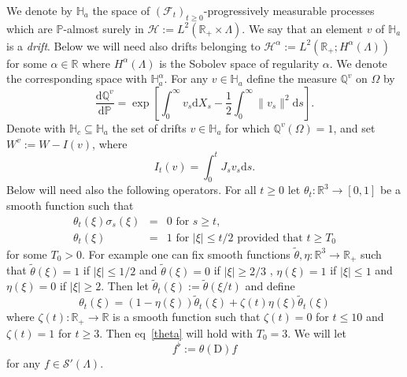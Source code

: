 \documentclass[11pt]{article}
\newcommand{\assign}{:=}
\newcommand{\mathD}{\mathrm{D}}
\newcommand{\mathd}{\mathrm{d}}
\newcommand{\tmtextit}[1]{{\itshape{#1}}}
\newcommand{\CF}{\mathscr{F}}
\newcommand{\CS}{\mathscr{S}}
\begin{document}
We denote by $\mathbb{H}_a$ the space of $\left( \CF_t \right)_{t \geqslant
0}$-progressively measurable processes which are $\mathbb{P}$-almost surely in
$\mathcal{H} \assign L^2 (\mathbb{R}_+ \times \Lambda)$. We say that an
element $v$ of $\mathbb{H}_a$ is a \tmtextit{drift}. Below we will need also
drifts belonging to $\mathcal{H}^{\alpha} \assign L^2 (\mathbb{R}_+ ;
H^{\alpha} (\Lambda))$ for some $\alpha \in \mathbb{R}$ where $H^{\alpha}
(\Lambda)$ is the Sobolev space of regularity $\alpha$. We denote the
corresponding space with $\mathbb{H}_a^{\alpha}$. For any $v \in \mathbb{H}_a$
define the measure $\mathbb{Q}^v$ on $\Omega$ by
\[ \frac{\mathd \mathbb{Q}^v}{\mathd \mathbb{P}} = \exp \left[ \int_0^{\infty}
   v_s \mathd X_s - \frac{1}{2} \int_0^{\infty} \| v_s \|^2 \mathd s \right] .
\]
Denote with $\mathbb{H}_c \subseteq \mathbb{H}_a$ the set of drifts $v \in
\mathbb{H}_a$ for which $\mathbb{Q}^v (\Omega) = 1$, and set $W^v \assign W -
I (v)$, where
\[ I_t (v) = \int^t_0 J_s v_s \mathd s. \]
Below will need also the following operators. For all $t \geqslant 0$ let
$\theta_t : \mathbb{R}^3 \rightarrow [0, 1]$ be a smooth function such that
\begin{equation}
  \begin{array}{lll}
    \theta_t (\xi) \sigma_s (\xi) & = & \text{$0$ for $s \geqslant t$,}\\
    \theta_t (\xi) & = & \text{$1$ for $| \xi | \leqslant t / 2$ \ provided
    that $t \geqslant T_0$}
  \end{array} \label{theta}
\end{equation}
for some $T_0 > 0$. For example one can fix smooth functions $\tilde{\theta},
\eta : \mathbb{R}^3 \rightarrow \mathbb{R}_+$ such that $\tilde{\theta} (\xi)
= 1$ if $| \xi | \leqslant 1 / 2$ and $\tilde{\theta} (\xi) = 0$ if $| \xi |
\geqslant 2 / 3$ , $\eta (\xi) = 1$ if $| \xi | \leqslant 1$ and $\eta (\xi) =
0$ if $| \xi | \geqslant 2$. Then let $\tilde{\theta}_t (\xi) \assign
\tilde{\theta} (\xi / t)$ and define
\[ \theta_t (\xi) = (1 - \eta (\xi)) \tilde{\theta}_t (\xi) + \zeta (t) \eta
   (\xi) \tilde{\theta}_t (\xi) \]
where $\zeta (t) : \mathbb{R}_+ \rightarrow \mathbb{R}$ is a smooth function
such that $\zeta (t) = 0$ for $t \leqslant 10$ and $\zeta (t) = 1$ for $t
\geqslant 3$. Then eq~{\eqref{theta}} will hold with $T_0 = 3$. We will let
\begin{equation}
  f^{\flat} \assign \theta (\mathD) f \label{eq:flat}
\end{equation}
for any $f \in \CS' (\Lambda)$.
\end{document}
